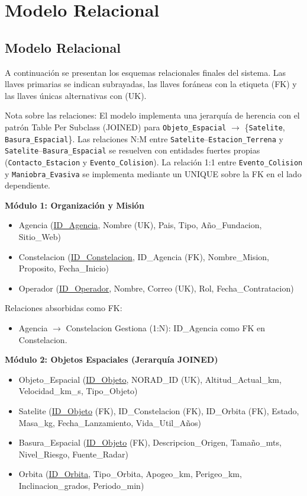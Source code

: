 \chapter{Modelo Relacional}

\section{Modelo Relacional}

A continuación se presentan los esquemas relacionales finales del sistema. Las llaves primarias se indican subrayadas, las llaves foráneas con la etiqueta (FK) y las llaves únicas alternativas con (UK).

Nota sobre las relaciones: El modelo implementa una jerarquía de herencia con el patrón Table Per Subclass (JOINED) para \texttt{Objeto\_Espacial} $\rightarrow$ \{\texttt{Satelite}, \texttt{Basura\_Espacial}\}. Las relaciones N:M entre \texttt{Satelite}--\texttt{Estacion\_Terrena} y \texttt{Satelite}--\texttt{Basura\_Espacial} se resuelven con entidades fuertes propias (\texttt{Contacto\_Estacion} y \texttt{Evento\_Colision}). La relación 1:1 entre \texttt{Evento\_Colision} y \texttt{Maniobra\_Evasiva} se implementa mediante un UNIQUE sobre la FK en el lado dependiente.

\vspace{0.5cm}
\noindent \textbf{Módulo 1: Organización y Misión}

\begin{itemize}
    \item Agencia (\underline{ID\_Agencia}, Nombre (UK), Pais, Tipo, Año\_Fundacion, Sitio\_Web)
    \item Constelacion (\underline{ID\_Constelacion}, ID\_Agencia (FK), Nombre\_Mision, Proposito, Fecha\_Inicio)
    \item Operador (\underline{ID\_Operador}, Nombre, Correo (UK), Rol, Fecha\_Contratacion)
\end{itemize}

Relaciones absorbidas como FK:
\begin{itemize}
    \item Agencia $\rightarrow$ Constelacion Gestiona (1:N): ID\_Agencia como FK en Constelacion.
\end{itemize}

\vspace{0.5cm}
\noindent \textbf{Módulo 2: Objetos Espaciales (Jerarquía JOINED)}

\begin{itemize}
    \item Objeto\_Espacial (\underline{ID\_Objeto}, NORAD\_ID (UK), Altitud\_Actual\_km, Velocidad\_km\_s, Tipo\_Objeto)
    \item Satelite (\underline{ID\_Objeto} (FK), ID\_Constelacion (FK), ID\_Orbita (FK), Estado, Masa\_kg, Fecha\_Lanzamiento, Vida\_Util\_Años)
    \item Basura\_Espacial (\underline{ID\_Objeto} (FK), Descripcion\_Origen, Tamaño\_mts, Nivel\_Riesgo, Fuente\_Radar)
    \item Orbita (\underline{ID\_Orbita}, Tipo\_Orbita, Apogeo\_km, Perigeo\_km, Inclinacion\_grados, Periodo\_min)
\end{itemize}

